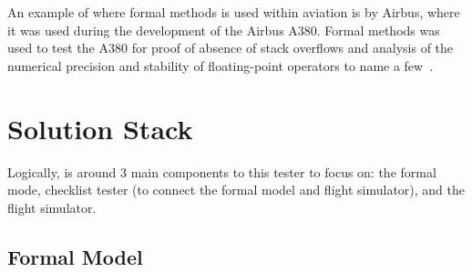 \documentclass[../dissertation.tex]{subfiles}
\begin{document}
An example of where formal methods is used within aviation is by Airbus, where
it was used during the development of the Airbus A380. Formal methods was used to test
the A380 for proof of absence of stack overflows and analysis of the numerical precision
and stability of floating-point operators to name a few~\cite{airbus:formal}.



\section{Solution Stack}

Logically, is around 3 main components to this tester to focus on: the formal mode,
checklist tester (to connect the formal model and flight simulator), and the flight simulator.


\subsection{Formal Model}
\end{document}
